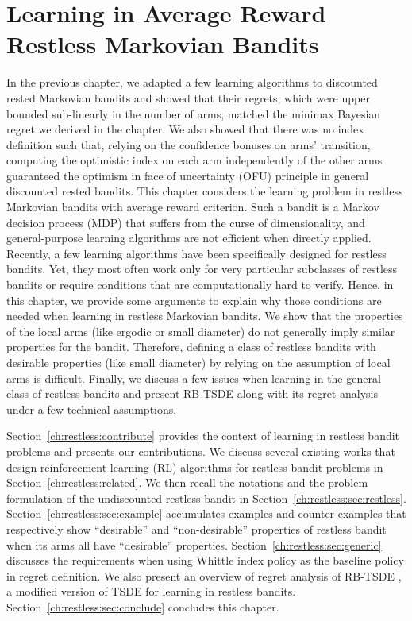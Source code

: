 \begingroup

\let\clearpage\relax

\chapter{Learning in Average Reward Restless Markovian Bandits}
\label{ch:learning_restless}

In the previous chapter, we adapted a few learning algorithms to discounted rested Markovian bandits and showed that their regrets, which were upper bounded sub-linearly in the number of arms, matched the minimax Bayesian regret we derived in the chapter.
We also showed that there was no index definition such that, relying on the confidence bonuses on arms' transition, computing the optimistic index on each arm independently of the other arms guaranteed the optimism in face of uncertainty (OFU) principle in general discounted rested bandits.
This chapter considers the learning problem in restless Markovian bandits with average reward criterion.
Such a bandit is a Markov decision process (MDP) that suffers from the curse of dimensionality, and general-purpose learning algorithms are not efficient when directly applied. Recently, a few learning algorithms have been specifically designed for restless bandits. Yet, they most often work only for very particular subclasses of restless bandits or require conditions that are computationally hard to verify.
Hence, in this chapter, we provide some arguments to explain why those conditions are needed when learning in restless Markovian bandits. We show that the properties of the local arms (like ergodic or small diameter) do not generally imply similar properties for the bandit. Therefore, defining a class of restless bandits with desirable properties (like small diameter) by relying on the assumption of local arms is difficult. 
Finally, we discuss a few issues when learning in the general class of restless bandits and present RB-TSDE \cite{akbarzadeh2022learning} along with its regret analysis under a few technical assumptions.

Section~\ref{ch:restless:contribute} provides the context of learning in restless bandit problems and presents our contributions.
We discuss several existing works that design reinforcement learning (RL) algorithms for restless bandit problems in Section~\ref{ch:restless:related}.
We then recall the notations and the problem formulation of the undiscounted restless bandit in Section~\ref{ch:restless:sec:restless}.
Section~\ref{ch:restless:sec:example} accumulates examples and counter-examples that respectively show ``desirable'' and ``non-desirable'' properties of restless bandit when its arms all have ``desirable'' properties.
Section~\ref{ch:restless:sec:generic} discusses the requirements when using Whittle index policy as the baseline policy in regret definition.
We also present an overview of regret analysis of RB-TSDE \cite{akbarzadeh2022learning}, a modified version of TSDE \cite{ouyang2017learning} for learning in restless bandits.
Section~\ref{ch:restless:sec:conclude} concludes this chapter.

